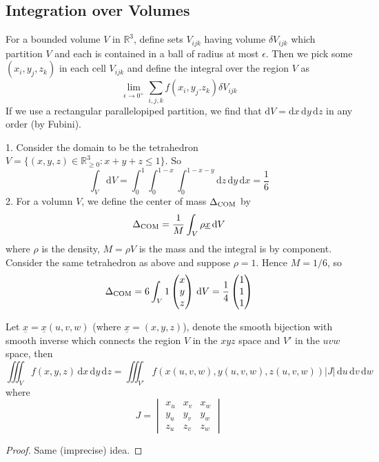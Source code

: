 \subsection{Integration over Volumes}
For a bounded volume $V$ in $\mathbb R^3$, define sets $V_{ijk}$ having volume $\delta V_{ijk}$ which partition $V$ and each is contained in a ball of radius at most $\epsilon$.
Then we pick some $(x_i,y_j,z_k)$ in each cell $V_{ijk}$ and define the integral over the region $V$ as
$$\lim_{\epsilon\to 0^+}\sum_{i,j,k}f(x_i,y_j.z_k)\delta V_{ijk}$$
If we use a rectangular parallelopiped partition, we find that $\mathrm dV=\mathrm dx\,\mathrm dy\,\mathrm dz$ in any order (by Fubini).
\begin{example}
    1. Consider the domain to be the tetrahedron $V=\{(x,y,z)\in\mathbb R_{\ge 0}^3:x+y+z\le 1\}$.
    So
    $$\int_V\mathrm dV=\int_0^1\int_0^{1-x}\int_0^{1-x-y}\mathrm dz\,\mathrm dy\,\mathrm dx=\frac{1}{6}$$
    2. For a volumn $V$, we define the center of mass $\Delta_{\rm COM}$ by
    $$\Delta_{\rm COM}=\frac{1}{M}\int_V\rho\underline{x}\,\mathrm dV$$
    where $\rho$ is the density, $M=\rho V$ is the mass and the integral is by component.
    Consider the same tetrahedron as above and suppose $\rho=1$.
    Hence $M=1/6$, so
    $$\Delta_{\rm COM}=6\int_V1\begin{pmatrix}
        x\\
        y\\
        z
    \end{pmatrix}\,\mathrm dV=\frac{1}{4}\begin{pmatrix}
        1\\
        1\\
        1
    \end{pmatrix}$$
\end{example}
\begin{proposition}
    Let $\underline{x}=\underline{x}(u,v,w)$ (where $\underline{x}=(x,y,z)$), denote the smooth bijection with smooth inverse which connects the region $V$ in the $xyz$ space and $V'$ in the $uvw$ space, then
    $$\iiint_Vf(x,y,z)\,\mathrm dx\,\mathrm dy\,\mathrm dz=\iiint_{V'}f(x(u,v,w),y(u,v,w),z(u,v,w))|J|\,\mathrm du\,\mathrm dv\,\mathrm dw$$
    where
    $$J=\begin{vmatrix}
        x_u&x_v&x_w\\
        y_u&y_v&y_w\\
        z_u&z_v&z_w
    \end{vmatrix}$$
\end{proposition}
\begin{proof}
    Same (imprecise) idea.
\end{proof}
